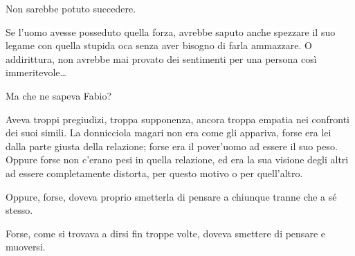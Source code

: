 Non sarebbe potuto succedere. 

Se l'uomo avesse posseduto quella forza, avrebbe saputo anche spezzare il suo legame con quella stupida oca senza aver bisogno di farla ammazzare. O addirittura, non avrebbe mai provato dei sentimenti per una persona così immeritevole\ldots

Ma che ne sapeva Fabio? 

Aveva troppi pregiudizi, troppa supponenza, ancora troppa empatia nei confronti dei suoi simili. La donnicciola magari non era come gli appariva, forse era lei dalla parte giusta della relazione; forse era il pover'uomo ad essere il suo peso. Oppure forse non c'erano pesi in quella relazione, ed era la sua visione degli altri ad essere completamente distorta, per questo motivo o per quell'altro. 

Oppure, forse, doveva proprio smetterla di pensare a chiunque tranne che a sé stesso. 

Forse, come si trovava a dirsi fin troppe volte, doveva smettere di pensare e muoversi.
